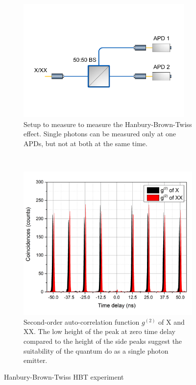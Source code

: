 \begin{figure}[H]
	\centering
	\begin{subfigure}[b]{0.48\textwidth}
		\centering
		\includegraphics[width=0.95\textwidth]{figures/quantum-dot/HBT_Fiber.pdf}
		\caption{Setup to measure to measure the Hanbury-Brown-Twiss effect.
		Single photons can be measured only at one APDs, but not at both at the same time.}
		\label{fig:hbt-fiber}
	\end{subfigure}%
	~ %
	\begin{subfigure}[b]{0.48\textwidth}
		\centering
		\includegraphics[width=\textwidth]{figures/quantum-dot/G2_X_XX.png}
		\caption{Second-order auto-correlation function $g^{(2)}$ of \ac{X} and \ac{XX}.
		The low height of the peak at zero time delay compared to the height of the side peaks suggest the suitability of the quantum do as a single photon emitter.}
		\label{fig:gs2-x-xx}
	\end{subfigure}
	\caption{Hanbury-Brown-Twiss \acs{HBT} experiment~\cite{schimpf_towards_2017}}
	\label{fig:hbt}
\end{figure}


